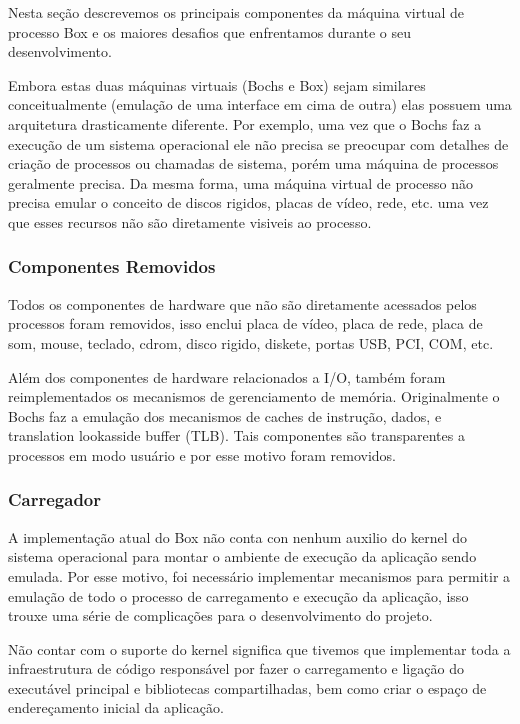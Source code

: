 \documentclass[11pt,twoside]{article}
\begin{document}
Nesta seção descrevemos os principais componentes da máquina virtual 
de processo Box e os maiores desafios que enfrentamos durante o seu 
desenvolvimento.

Embora estas duas máquinas virtuais (Bochs e Box) sejam similares 
conceitualmente (emulação de uma interface em cima de outra) elas
possuem uma arquitetura drasticamente diferente. Por exemplo, 
uma vez que o Bochs faz a execução de um sistema operacional ele
não precisa se preocupar com detalhes de criação de processos ou
chamadas de sistema, porém uma máquina de processos geralmente
precisa. Da mesma forma, uma máquina virtual de processo não precisa
emular o conceito de discos rigidos, placas de vídeo, rede, etc. uma
vez que esses recursos não são diretamente visiveis ao processo.


\subsubsection{Componentes Removidos}

Todos os componentes de hardware que não são diretamente acessados
pelos processos foram removidos, isso enclui placa de vídeo, placa de
rede, placa de som, mouse, teclado, cdrom, disco rigido, diskete, portas
USB, PCI, COM, etc.

Além dos componentes de hardware relacionados a I/O, também foram
reimplementados os mecanismos de gerenciamento de
memória. Originalmente o Bochs faz a emulação dos mecanismos de caches
de instrução, dados, e translation lookasside buffer (TLB). Tais
componentes são transparentes a processos em modo usuário e por esse
motivo foram removidos.

\subsubsection{Carregador}

A implementação atual do Box não conta con nenhum auxilio do kernel do
sistema operacional para montar o ambiente de execução da aplicação
sendo emulada. Por esse motivo, foi necessário implementar mecanismos
para permitir a emulação de todo o processo de carregamento e execução
da aplicação, isso trouxe uma série de complicações para o
desenvolvimento do projeto.

Não contar com o suporte do kernel significa que tivemos que implementar
toda a infraestrutura de código responsável por fazer o 
carregamento e ligação do executável principal e bibliotecas compartilhadas,
bem como criar o espaço de endereçamento inicial da aplicação.
\end{document}
